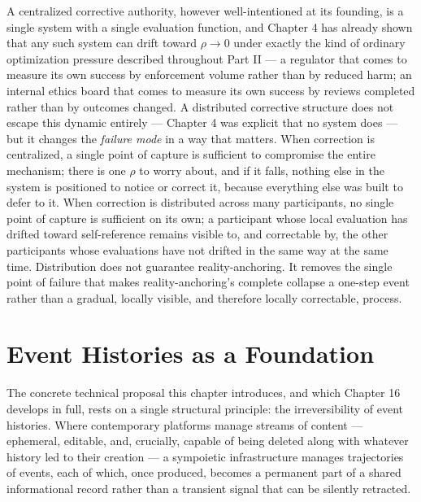 \documentclass[12pt,a4paper]{book}
\begin{document}
A centralized corrective authority, however well-intentioned at its founding, is a single system with a single evaluation function, and Chapter 4 has already shown that any such system can drift toward $\rho \to 0$ under exactly the kind of ordinary optimization pressure described throughout Part II — a regulator that comes to measure its own success by enforcement volume rather than by reduced harm; an internal ethics board that comes to measure its own success by reviews completed rather than by outcomes changed. A distributed corrective structure does not escape this dynamic entirely — Chapter 4 was explicit that no system does — but it changes the \emph{failure mode} in a way that matters. When correction is centralized, a single point of capture is sufficient to compromise the entire mechanism; there is one $\rho$ to worry about, and if it falls, nothing else in the system is positioned to notice or correct it, because everything else was built to defer to it. When correction is distributed across many participants, no single point of capture is sufficient on its own; a participant whose local evaluation has drifted toward self-reference remains visible to, and correctable by, the other participants whose evaluations have not drifted in the same way at the same time. Distribution does not guarantee reality-anchoring. It removes the single point of failure that makes reality-anchoring's complete collapse a one-step event rather than a gradual, locally visible, and therefore locally correctable, process.

\section{Event Histories as a Foundation}

The concrete technical proposal this chapter introduces, and which Chapter 16 develops in full, rests on a single structural principle: the irreversibility of event histories. Where contemporary platforms manage streams of content — ephemeral, editable, and, crucially, capable of being deleted along with whatever history led to their creation — a sympoietic infrastructure manages trajectories of events, each of which, once produced, becomes a permanent part of a shared informational record rather than a transient signal that can be silently retracted.
\end{document}
